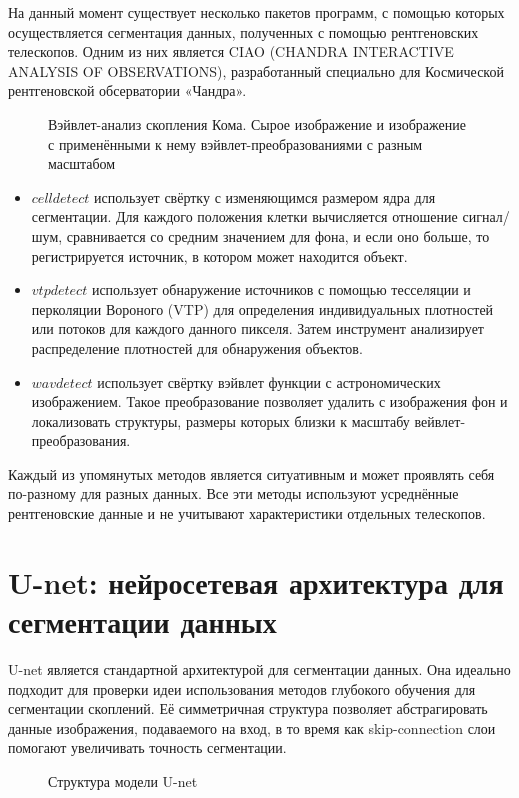 На данный момент существует несколько пакетов программ, с помощью которых осуществляется 
сегментация данных, полученных с помощью рентгеновских телескопов. Одним из них является CIAO 
(CHANDRA INTERACTIVE ANALYSIS OF OBSERVATIONS), разработанный специально для Космической 
рентгеновской обсерватории «Чандра». \\

\begin{figure}[h]
    \caption{Вэйвлет-анализ скопления Кома. Сырое изображение и изображение с применёнными 
        к нему вэйвлет-преобразованиями с разным масштабом \cite{Vikhlinin}}
\end{figure}

\begin{itemize}
    \item $celldetect$ использует свёртку с изменяющимся размером ядра для сегментации. Для каждого
        положения клетки вычисляется отношение сигнал/шум, сравнивается со средним значением для 
        фона, и если оно больше, то регистрируется источник, в котором может находится объект.
    \item $vtpdetect$ использует обнаружение источников с помощью тесселяции и перколяции Вороного 
        (VTP) для определения индивидуальных плотностей или потоков для каждого данного пикселя. 
        Затем инструмент анализирует распределение плотностей для обнаружения объектов.
    \item $wavdetect$ использует свёртку вэйвлет функции с астрономических изображением. Такое 
		преобразование позволяет удалить с изображения фон и локализовать структуры, размеры 
		которых близки к масштабу вейвлет-преобразования.
\end{itemize}

Каждый из упомянутых методов является ситуативным и может проявлять себя по-разному для разных 
данных. Все эти методы используют усреднённые рентгеновские данные и не учитывают характеристики 
отдельных телескопов.\\

\section{U-net: нейросетевая архитектура для сегментации данных}
U-net \cite{Unet} является стандартной архитектурой для сегментации данных. Она идеально подходит 
для проверки идеи использования методов глубокого обучения для сегментации скоплений.
Её симметричная структура позволяет абстрагировать данные изображения, подаваемого на 
вход, в то время как skip-connection слои помогают увеличивать точность сегментации.

\begin{figure}[h]
    \caption{Структура модели U-net \cite{Unet}}
\end{figure}
